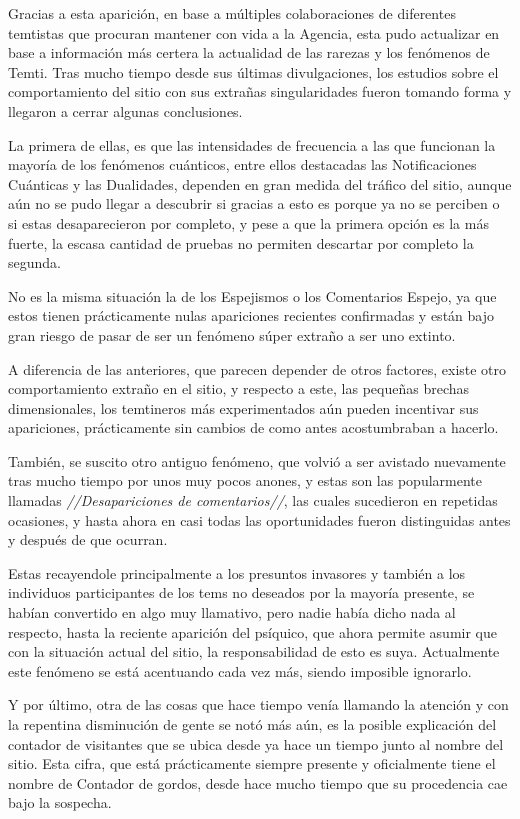 \documentclass[
  spanish,
]{book}
\begin{document}
Gracias a esta aparición, en base a múltiples colaboraciones de diferentes temtistas que procuran mantener con vida a la Agencia, esta pudo actualizar en base a información más certera la actualidad de las rarezas y los fenómenos de Temti. Tras mucho tiempo desde sus últimas divulgaciones, los estudios sobre el comportamiento del sitio con sus extrañas singularidades fueron tomando forma y llegaron a cerrar algunas conclusiones.

La primera de ellas, es que las intensidades de frecuencia a las que funcionan la mayoría de los fenómenos cuánticos, entre ellos destacadas las Notificaciones Cuánticas y las Dualidades, dependen en gran medida del tráfico del sitio, aunque aún no se pudo llegar a descubrir si gracias a esto es porque ya no se perciben o si estas desaparecieron por completo, y pese a que la primera opción es la más fuerte, la escasa cantidad de pruebas no permiten descartar por completo la segunda.

No es la misma situación la de los Espejismos o los Comentarios Espejo, ya que estos tienen prácticamente nulas apariciones recientes confirmadas y están bajo gran riesgo de pasar de ser un fenómeno súper extraño a ser uno extinto.

A diferencia de las anteriores, que parecen depender de otros factores, existe otro comportamiento extraño en el sitio, y respecto a este, las pequeñas brechas dimensionales, los temtineros más experimentados aún pueden incentivar sus apariciones, prácticamente sin cambios de como antes acostumbraban a hacerlo.

También, se suscito otro antiguo fenómeno, que volvió a ser avistado nuevamente tras mucho tiempo por unos muy pocos anones, y estas son las popularmente llamadas \emph{//Desapariciones de comentarios//}, las cuales sucedieron en repetidas ocasiones, y hasta ahora en casi todas las oportunidades fueron distinguidas antes y después de que ocurran.

Estas recayendole principalmente a los presuntos invasores y también a los individuos participantes de los tems no deseados por la mayoría presente, se habían convertido en algo muy llamativo, pero nadie había dicho nada al respecto, hasta la reciente aparición del psíquico, que ahora permite asumir que con la situación actual del sitio, la responsabilidad de esto es suya. Actualmente este fenómeno se está acentuando cada vez más, siendo imposible ignorarlo.

Y por último, otra de las cosas que hace tiempo venía llamando la atención y con la repentina disminución de gente se notó más aún, es la posible explicación del contador de visitantes que se ubica desde ya hace un tiempo junto al nombre del sitio. Esta cifra, que está prácticamente siempre presente y oficialmente tiene el nombre de Contador de gordos, desde hace mucho tiempo que su procedencia cae bajo la sospecha.
\end{document}
